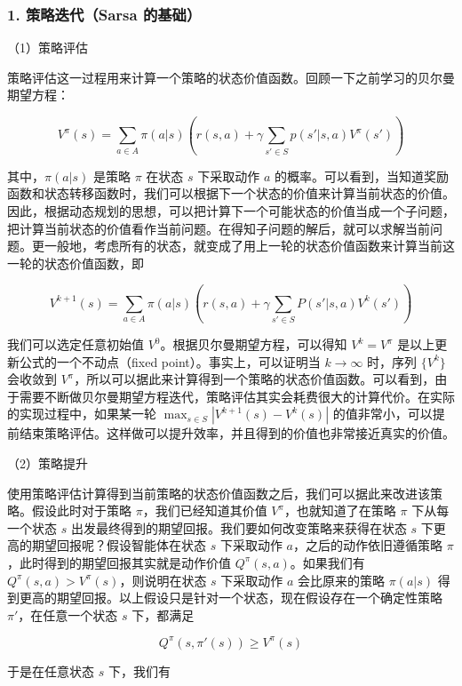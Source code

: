 \hypertarget{ux7b56ux7565ux8fedux4ee3sarsa-ux7684ux57faux7840}{%
\subsubsection{1. 策略迭代（Sarsa 的基础）}\label{ux7b56ux7565ux8fedux4ee3sarsa-ux7684ux57faux7840}}

（1）策略评估

策略评估这一过程用来计算一个策略的状态价值函数。回顾一下之前学习的贝尔曼期望方程：

\[
V^{\pi}(s)=\sum_{a\in A}\pi(a|s)(r(s,a)+\gamma\sum_{s'\in S}p(s'|s,a)V^{\pi}(s'))
\]

其中，\(\pi(a|s)\) 是策略 \(\pi\) 在状态 \(s\) 下采取动作 \(a\) 的概率。可以看到，当知道奖励函数和状态转移函数时，我们可以根据下一个状态的价值来计算当前状态的价值。因此，根据动态规划的思想，可以把计算下一个可能状态的价值当成一个子问题，把计算当前状态的价值看作当前问题。在得知子问题的解后，就可以求解当前问题。更一般地，考虑所有的状态，就变成了用上一轮的状态价值函数来计算当前这一轮的状态价值函数，即

\[
V^{k+1}(s)=\sum_{a\in A}\pi(a|s)(r(s,a)+\gamma\sum_{s'\in S}P(s'|s,a)V^{k}(s'))
\]

我们可以选定任意初始值 \(V^{0}\)。根据贝尔曼期望方程，可以得知 \(V^{k}=V^{\pi}\) 是以上更新公式的一个不动点（fixed point）。事实上，可以证明当 \(k\to\infty\) 时，序列 \(\{V^{k}\}\) 会收敛到 \(V^{\pi}\)，所以可以据此来计算得到一个策略的状态价值函数。可以看到，由于需要不断做贝尔曼期望方程迭代，策略评估其实会耗费很大的计算代价。在实际的实现过程中，如果某一轮 \(\max_{s\in S}|V^{k+1}(s)-V^{k}(s)|\) 的值非常小，可以提前结束策略评估。这样做可以提升效率，并且得到的价值也非常接近真实的价值。

（2）策略提升

使用策略评估计算得到当前策略的状态价值函数之后，我们可以据此来改进该策略。假设此时对于策略 \(\pi\)，我们已经知道其价值 \(V^{\pi}\)，也就知道了在策略 \(\pi\) 下从每一个状态 \(s\) 出发最终得到的期望回报。我们要如何改变策略来获得在状态 \(s\) 下更高的期望回报呢？假设智能体在状态 \(s\) 下采取动作 \(a\)，之后的动作依旧遵循策略 \(\pi\)，此时得到的期望回报其实就是动作价值 \(Q^{\pi}(s,a)\)。如果我们有 \(Q^{\pi}(s,a)>V^{\pi}(s)\)，则说明在状态 \(s\) 下采取动作 \(a\) 会比原来的策略 \(\pi(a|s)\) 得到更高的期望回报。以上假设只是针对一个状态，现在假设存在一个确定性策略 \(\pi'\)，在任意一个状态 \(s\) 下，都满足

\[
Q^{\pi}(s,\pi'(s))\ge V^{\pi}(s)
\]

于是在任意状态 \(s\) 下，我们有


